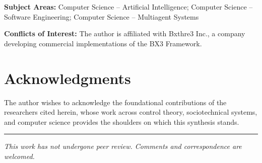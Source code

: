 \documentclass[12pt]{article}
\begin{document}
\textbf{Subject Areas:} Computer Science -- Artificial Intelligence; Computer Science -- Software Engineering; Computer Science -- Multiagent Systems

\textbf{Conflicts of Interest:} The author is affiliated with Bxthre3 Inc., a company developing commercial implementations of the BX3 Framework.

\section*{Acknowledgments}

The author wishes to acknowledge the foundational contributions of the researchers cited herein, whose work across control theory, sociotechnical systems, and computer science provides the shoulders on which this synthesis stands.




\vspace{2em}
\hrule
\vspace{0.5em}
\noindent\small\textit{This work has not undergone peer review. Comments and correspondence are welcomed.}
\end{document}
